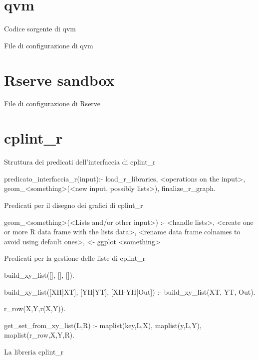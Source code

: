 \documentclass[10pt,titlepage,twoside,a4paper]{report}
\newenvironment{code}{\singlespacing\captionsetup{type=listing}}{}
\begin{document}
\appendix
\chapter{qvm} \label{app:qvm}

    \begin{code}
        \caption{Codice sorgente di qvm}
    \end{code}

    \newpage

    \begin{code}
        \caption{File di configurazione di qvm}
    \end{code}

\chapter{Rserve sandbox} \label{app:rserve-sandbox}
    \begin{code}
        \caption{File di configurazione di Rserve}
    \end{code}

\chapter{cplint\_r} \label{app:cplint-r}
    \begin{code}
        \caption{Struttura dei predicati dell'interfaccia di cplint\_r}
        \begin{prologcode*}{}
predicato_interfaccia_r(input):-
    load_r_libraries,
    <operations on the input>,
    geom_<something>(<new input, possibly lists>),
    finalize_r_graph.
        \end{prologcode*}
    \end{code}

    \begin{code}
        \caption{Predicati per il disegno dei grafici di cplint\_r}
        \begin{textcode*}{}
geom_<something>(<Lists and/or other input>) :-
    <handle lists>,
    <create one or more R data frame with the lists data>,
    <rename data frame colnames to avoid using default ones>,
    <- ggplot <something>
        \end{textcode*}
    \end{code}

        \begin{code}
            \caption{Predicati per la gestione delle liste di cplint\_r}
            \begin{textcode*}{}
build_xy_list([], [], []).

build_xy_list([XH|XT], [YH|YT], [XH-YH|Out]) :-
        build_xy_list(XT, YT, Out).

r_row(X,Y,r(X,Y)).

get_set_from_xy_list(L,R) :-
    maplist(key,L,X),
    maplist(y,L,Y),
maplist(r_row,X,Y,R).
            \end{textcode*}
        \end{code}

    \begin{code}
        \caption{La libreria cplint\_r}
    \end{code}



\end{document}
